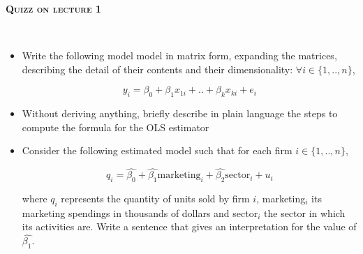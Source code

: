 \documentclass[a4, 12pt]{report}
\begin{document}



\begin{center}
	\Huge \textbf{\textsc{Quizz on lecture 1}}
\end{center}
\normalsize
		~\\
		
	\begin{itemize}
		\item  Write the following model model in matrix form, expanding the matrices, describing the detail of their contents and their dimensionality: $\forall i \in \{1, .., n\}$, 
		
		\[y_i = \beta_0 + \beta_1 x_{1i} + .. + \beta_k x_{ki} + e_i\]
			\vspace{6cm}
		\item Without deriving anything, briefly describe in plain language the steps to compute the formula for the OLS estimator
			\vspace{3cm}
		\item Consider the following estimated model such that for each firm $i \in \{1, .., n\}$,
		
		 	\[q_i = \hat{\beta_0} + \hat{\beta_1} \text{marketing}_{i} + \hat{\beta_2} \text{sector}_i + u_i\]
			
			 where $q_i$ represents the quantity of units sold by firm $i$, marketing$_i$ its marketing spendings in thousands of dollars and sector$_i$ the sector in which its activities are. Write a sentence that gives an interpretation for the value of $\hat{\beta_1}$.
			\vspace{4cm}
	\end{itemize}
		
		
				
		

				
				
				
\end{document}
